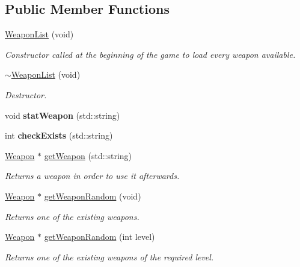 \subsection*{Public Member Functions}
\begin{DoxyCompactItemize}
\item 
\hyperlink{class_weapon_list_ac3a994cd2844ac00fcf09011f4209f48}{Weapon\+List} (void)
\begin{DoxyCompactList}\small\item\em Constructor called at the beginning of the game to load every weapon available. \end{DoxyCompactList}\item 
\hyperlink{class_weapon_list_a44f72440d8a4586b19e4b60d308b2e51}{$\sim$\+Weapon\+List} (void)
\begin{DoxyCompactList}\small\item\em Destructor. \end{DoxyCompactList}\item 
\hypertarget{class_weapon_list_ad39bd93b72f73eb7e69388dd5d4bfac2}{void {\bfseries stat\+Weapon} (std\+::string)}\label{class_weapon_list_ad39bd93b72f73eb7e69388dd5d4bfac2}

\item 
\hypertarget{class_weapon_list_ae78b4c0d1922a5f2b3358c7c2b46daff}{int {\bfseries check\+Exists} (std\+::string)}\label{class_weapon_list_ae78b4c0d1922a5f2b3358c7c2b46daff}

\item 
\hyperlink{class_weapon}{Weapon} $\ast$ \hyperlink{class_weapon_list_a97b9173cefa20573ed27d52d58d1292e}{get\+Weapon} (std\+::string)
\begin{DoxyCompactList}\small\item\em Returns a weapon in order to use it afterwards. \end{DoxyCompactList}\item 
\hyperlink{class_weapon}{Weapon} $\ast$ \hyperlink{class_weapon_list_aee801adca4fe1154993eedc6c71b3dca}{get\+Weapon\+Random} (void)
\begin{DoxyCompactList}\small\item\em Returns one of the existing weapons. \end{DoxyCompactList}\item 
\hyperlink{class_weapon}{Weapon} $\ast$ \hyperlink{class_weapon_list_a80b1e46c7e1fa0e6be725fe8d13ed93d}{get\+Weapon\+Random} (int level)
\begin{DoxyCompactList}\small\item\em Returns one of the existing weapons of the required level. \end{DoxyCompactList}\end{DoxyCompactItemize}
